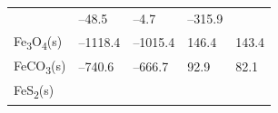 \documentclass[
  9pt,
]{extbook}
\theoremstyle{definition}
\theoremstyle{definition}
\theoremstyle{definition}
\theoremstyle{remark}
\begin{document}
\begin{longtable}[]{@{}lllll@{}}
\begin{minipage}[t]{0.10\columnwidth}
\end{minipage} & \begin{minipage}[t]{0.19\columnwidth}\raggedright
--48.5\strut
\end{minipage} & \begin{minipage}[t]{0.20\columnwidth}\raggedright
--4.7\strut
\end{minipage} & \begin{minipage}[t]{0.18\columnwidth}\raggedright
--315.9 \textbar{}\strut
\end{minipage} & \begin{minipage}[t]{0.18\columnwidth}\raggedright
\strut
\end{minipage}\tabularnewline
\begin{minipage}[t]{0.10\columnwidth}\raggedright
Fe\textsubscript{3}O\textsubscript{4}(s)\strut
\end{minipage} & \begin{minipage}[t]{0.19\columnwidth}\raggedright
--1118.4\strut
\end{minipage} & \begin{minipage}[t]{0.20\columnwidth}\raggedright
--1015.4\strut
\end{minipage} & \begin{minipage}[t]{0.18\columnwidth}\raggedright
146.4\strut
\end{minipage} & \begin{minipage}[t]{0.18\columnwidth}\raggedright
143.4\strut
\end{minipage}\tabularnewline
\begin{minipage}[t]{0.10\columnwidth}\raggedright
FeCO\textsubscript{3}(s)\strut
\end{minipage} & \begin{minipage}[t]{0.19\columnwidth}\raggedright
--740.6\strut
\end{minipage} & \begin{minipage}[t]{0.20\columnwidth}\raggedright
--666.7\strut
\end{minipage} & \begin{minipage}[t]{0.18\columnwidth}\raggedright
92.9\strut
\end{minipage} & \begin{minipage}[t]{0.18\columnwidth}\raggedright
82.1\strut
\end{minipage}\tabularnewline
\begin{minipage}[t]{0.10\columnwidth}\raggedright
FeS\textsubscript{2}(s)\strut
\end{minipage} & \begin{minipage}[t]{0.19\columnwidth}\raggedright

\end{minipage}
\end{longtable}
\end{document}
